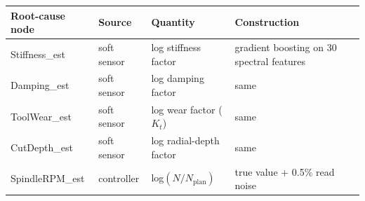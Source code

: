 \begin{tabular}{llll}
\toprule
Root-cause node & Source & Quantity & Construction \\
\midrule
Stiffness\_est & soft sensor & log stiffness factor & gradient boosting on 30 spectral features \\
Damping\_est & soft sensor & log damping factor & same \\
ToolWear\_est & soft sensor & log wear factor ($K_t$) & same \\
CutDepth\_est & soft sensor & log radial-depth factor & same \\
SpindleRPM\_est & controller & log$(N/N_\text{plan})$ & true value + 0.5\% read noise \\
\bottomrule
\end{tabular}
